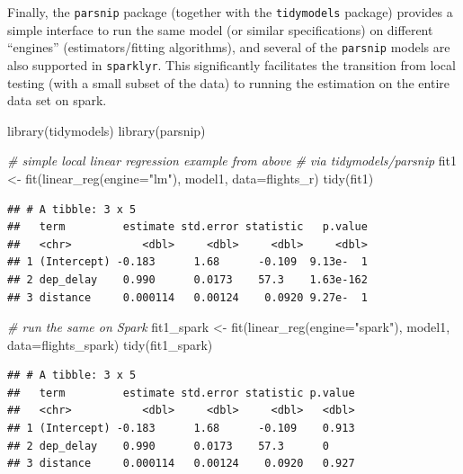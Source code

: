 \documentclass[
  12pt,
]{style/krantz}
\newenvironment{Shaded}{\begin{snugshade}}{\end{snugshade}}
\newcommand{\AttributeTok}[1]{\textcolor[rgb]{0.77,0.63,0.00}{#1}}
\newcommand{\CommentTok}[1]{\textcolor[rgb]{0.56,0.35,0.01}{\textit{#1}}}
\newcommand{\FunctionTok}[1]{\textcolor[rgb]{0.00,0.00,0.00}{#1}}
\newcommand{\NormalTok}[1]{#1}
\newcommand{\OtherTok}[1]{\textcolor[rgb]{0.56,0.35,0.01}{#1}}
\newcommand{\StringTok}[1]{\textcolor[rgb]{0.31,0.60,0.02}{#1}}
\begin{document}
Finally, the \texttt{parsnip} package (together with the \texttt{tidymodels} package) provides a simple interface to run the same model (or similar specifications) on different ``engines'' (estimators/fitting algorithms), and several of the \texttt{parsnip} models are also supported in \texttt{sparklyr}. This significantly facilitates the transition from local testing (with a small subset of the data) to running the estimation on the entire data set on spark.

\begin{Shaded}
\begin{Highlighting}[]
\FunctionTok{library}\NormalTok{(tidymodels)}
\FunctionTok{library}\NormalTok{(parsnip)}

\CommentTok{\# simple local linear regression example from above}
\CommentTok{\# via tidymodels/parsnip}
\NormalTok{fit1 }\OtherTok{\textless{}{-}} \FunctionTok{fit}\NormalTok{(}\FunctionTok{linear\_reg}\NormalTok{(}\AttributeTok{engine=}\StringTok{"lm"}\NormalTok{), model1, }\AttributeTok{data=}\NormalTok{flights\_r)}
\FunctionTok{tidy}\NormalTok{(fit1)}
\end{Highlighting}
\end{Shaded}

\begin{verbatim}
## # A tibble: 3 x 5
##   term         estimate std.error statistic   p.value
##   <chr>           <dbl>     <dbl>     <dbl>     <dbl>
## 1 (Intercept) -0.183      1.68      -0.109  9.13e-  1
## 2 dep_delay    0.990      0.0173    57.3    1.63e-162
## 3 distance     0.000114   0.00124    0.0920 9.27e-  1
\end{verbatim}

\begin{Shaded}
\begin{Highlighting}[]
\CommentTok{\# run the same on Spark }
\NormalTok{fit1\_spark }\OtherTok{\textless{}{-}} \FunctionTok{fit}\NormalTok{(}\FunctionTok{linear\_reg}\NormalTok{(}\AttributeTok{engine=}\StringTok{"spark"}\NormalTok{), model1, }\AttributeTok{data=}\NormalTok{flights\_spark)}
\FunctionTok{tidy}\NormalTok{(fit1\_spark)}
\end{Highlighting}
\end{Shaded}

\begin{verbatim}
## # A tibble: 3 x 5
##   term         estimate std.error statistic p.value
##   <chr>           <dbl>     <dbl>     <dbl>   <dbl>
## 1 (Intercept) -0.183      1.68      -0.109    0.913
## 2 dep_delay    0.990      0.0173    57.3      0    
## 3 distance     0.000114   0.00124    0.0920   0.927
\end{verbatim}
\end{document}
